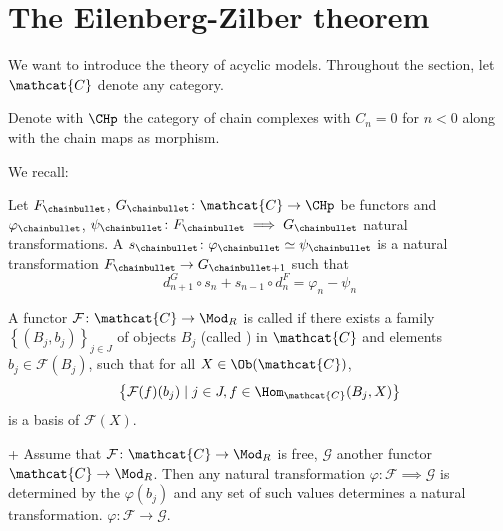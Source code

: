 \section{The Eilenberg-Zilber theorem}

We want to introduce the theory of acyclic models.
Throughout the section, let $\mathcat{C}$ denote any category.

\begin{notation}
  Denote with $\CHp$ the category of chain complexes with $C_n = 0$ for  $n<0$
  along with the chain maps as morphism.
\end{notation}

We recall:

\begin{definition}
  Let $F_\chainbullet$, $G_\chainbullet \colon \mathcat{C} \to  \CHp$ be functors
  and $\varphi _{\chainbullet}$,
  $\psi _{\chainbullet}\colon  F_{\chainbullet} \implies G_{\chainbullet}$
  natural transformations.
  A 
  $s_{\chainbullet} \colon  \varphi _{\chainbullet} \simeq \psi _{\chainbullet}$
  is a natural transformation $F_{\chainbullet} \to  G_{\chainbullet + 1}$
  such that
  \[
    d_{n+1}^G \circ  s_n + s_{n-1} \circ  d_n^F = \varphi _n - \psi _n
  \] 
\end{definition}

\begin{definition}
  A functor $\mathcal{F}\colon \mathcat{C} \to \Mod_{R}$
  is called  if there exists a family
  $\left\{(B_j, b_j) \right\}_{j\in J} $ 
  of objects $B_j$ (called ) in $\mathcat{C}$
  and elements $b_j \in \mathcal{F}(B_j)$,
  such that for all $X\in \Ob(\mathcat{C})$,
  \[
  \left\{\mathcal{F}(f) (b_j) \mid  j\in J, f\in \Hom_{\mathcat{C}}(B_j,X) \right\} 
  \]
  is a basis of $\mathcal{F}(X)$.
\end{definition}

\begin{lemma}+
  Assume that $\mathcal{F}\colon \mathcat{C} \to \Mod_R$ is free,
  $\mathcal{G}$ another functor  $\mathcat{C} \to  \Mod_R$.
  Then any natural transformation $\varphi \colon \mathcal{F} \implies \mathcal{G}$
  is determined by the $\varphi(b_j)$
  and any set of such values determines a natural transformation.
  $\varphi \colon \mathcal{F} \to  \mathcal{G}$.
\end{lemma}

